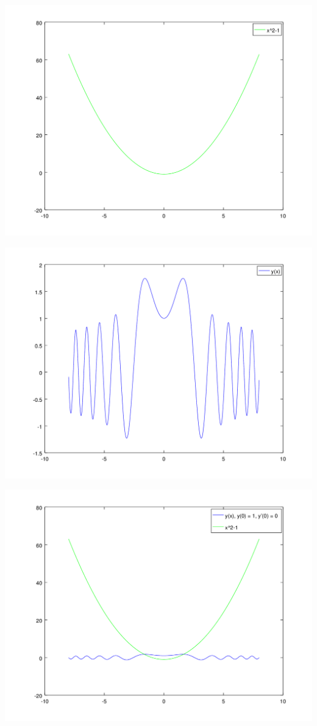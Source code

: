 \begin{refsection}
\includegraphics[scale=0.6]{./wellen/octave/images/a01a10/parabola.png}

\includegraphics[scale=0.6]{./wellen/octave/images/a01a10/wave.png}

\includegraphics[scale=0.6]{./wellen/octave/images/a01a10/wavewithparabola.png}

\printbibliography[heading=subbibliography]
\end{refsection}